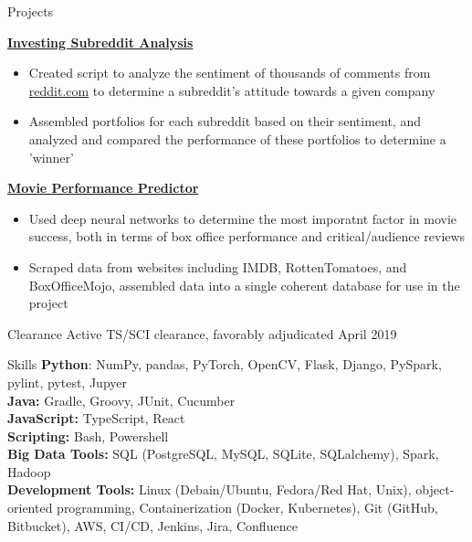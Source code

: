 \documentclass[8pt]{resumeclass}
\begin{document}
\vspace{8pt}
\resumesect
    {Projects}
    {\href{https://github.com/erkearney/investing-subreddit-analysis}{\textbf{Investing
    Subreddit Analysis}}
    \begin{itemize}[noitemsep,nolistsep]
	\item Created script to analyze the sentiment of thousands of comments
	from \href{reddit.com}{reddit.com} to determine a subreddit's attitude towards a given
	company
	\item Assembled portfolios for each subreddit based on their sentiment,
	and analyzed and compared the performance of these portfolios to
	determine a 'winner'
    \end{itemize}

    \vspace{3pt}
    \href{https://github.com/GabrieleMaurina/MoviePerformancePredictor}{\textbf{Movie
    Performance Predictor}}
    {\begin{itemize}[noitemsep,nolistsep]
	\item Used deep neural networks to determine the most imporatnt factor
	in movie success, both in terms of box office performance and
	critical/audience reviews
	\item Scraped data from websites including IMDB, RottenTomatoes, and
	BoxOfficeMojo, assembled data into a single coherent database for use in
	the project
    \end{itemize}}}
\vspace{8pt}
\resumesect
    {Clearance}
    {Active TS/SCI clearance, favorably adjudicated April 2019}
\vspace{8pt}

\resumesect
    {Skills}
    {
    \textbf{Python}: NumPy, pandas, PyTorch, OpenCV, Flask, Django, PySpark,
    pylint, pytest, Jupyer\\
    \textbf{Java:} Gradle, Groovy, JUnit, Cucumber\\
    \textbf{JavaScript:} TypeScript, React\\
    \textbf{Scripting:} Bash, Powershell\\
    \textbf{Big Data Tools:} SQL (PostgreSQL, MySQL, SQLite,
    SQLalchemy), Spark, Hadoop\\
    \textbf{Development Tools:} Linux (Debain/Ubuntu, Fedora/Red Hat, Unix),
    object-oriented programming, Containerization (Docker, Kubernetes), Git (GitHub, Bitbucket), AWS, CI/CD, Jenkins, Jira, Confluence}
\end{document}
